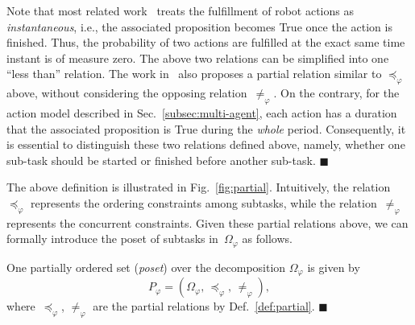 \begin{remark}\label{remark:duration}
Note that most related work~\cite{kantaros2020stylus, guo2015multi,
tumova2016multi, luo2021abstraction,luo2021temporal, sahin2019multirobot, jones2019scratchs}
treats the fulfillment of robot actions as \emph{instantaneous},
i.e., the associated proposition becomes True once the action is finished.
Thus, the probability of two actions are fulfilled at the exact same time instant is of measure zero.
The above two relations can be simplified into one ``less than'' relation. 
{The work in~\cite{luo2021temporal} also proposes a partial relation similar to $\preceq_\varphi$ above,
 without considering the opposing relation~$\neq_\varphi$.}
On the contrary, for the action model described in Sec.~\ref{subsec:multi-agent},
each action has a duration that the associated proposition is True during the \emph{whole} period.
Consequently, it is essential to distinguish these two relations defined above,
namely, whether one sub-task should be started or finished before another sub-task. 
\hfill  $\blacksquare$
\end{remark}


The above definition is illustrated in Fig.~\ref{fig:partial}.
Intuitively, the relation~$\preceq_{\varphi}$ represents the ordering
constraints among subtasks,
while the relation~$\neq_{\varphi}$ represents the concurrent constraints.
Given these partial relations above, we can formally introduce the poset of subtasks in~$\Omega_{\varphi}$ as follows.


\begin{definition}\label{def:poset}
One partially ordered set (\emph{poset}) over the decomposition $\Omega_{\varphi}$ is given by
\begin{equation}\label{eq:poset}
P_{\varphi} = (\Omega_{\varphi}, \, \preceq_{\varphi}, \, \neq_{\varphi}),
\end{equation}
where~$\preceq_{\varphi}$, $\neq_{\varphi}$ are the partial relations by
Def.~\ref{def:partial}.
\hfill $\blacksquare$
\end{definition}

